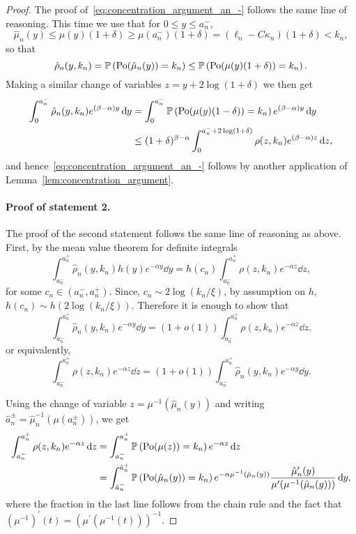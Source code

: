 \begin{proof}
The proof of~\eqref{eq:concentration_argument_an_-} follows the same line of reasoning. This time we use that for $0 \le y \le a_n^-$,
\[
	\hat{\mu}_n(y) \le \mu(y)(1 + \delta) \ge \mu(a_n^-)(1 + \delta)
		= (\ell_n - C \kappa_n)(1 + \delta) < k_n,
\]
so that 
\[
	\hat{\rho}_n(y,k_n) = \mathbb{P}\left({\mathrm{Po}}(\hat{\mu}_n(y)) = k_n\right) \le \mathbb{P}\left({\mathrm{Po}}(\mu(y)(1+\delta)) = k_n\right).
\]
Making a similar change of variables $z = y + 2 \log(1+\delta)$ we then get
\begin{align*}
	\int_0^{a_n^-} \hat{\rho}_n(y,k_n) e^{(\beta - \alpha)y} \operatorname{\mathrm{d}\hspace{-2pt}} y
	&= \int_0^{a_n^-}\mathbb{P}\left({\mathrm{Po}}(\mu(y)(1-\delta)) = k_n\right) 
		e^{(\beta-\alpha) y} \operatorname{\mathrm{d}\hspace{-2pt}} y\\
	&\le (1+\delta)^{\beta - \alpha} \int_0^{a_n^- + 2\log(1+\delta)} 
		\rho(z,k_n) e^{(\beta - \alpha)z} \operatorname{\mathrm{d}\hspace{-2pt}} z,
\end{align*}
and hence~\eqref{eq:concentration_argument_an_-} follows by another application of Lemma~\ref{lem:concentration_argument}. 

\paragraph{Proof of statement 2.}

The proof of the second statement follows the same line of reasoning as above. First, by the mean value theorem for definite integrals 
\[
	\int_{a_n^-}^{a_n^+} \hat{\rho}_n(y,k_n) h(y) e^{-\alpha y} \dd y
	= h(c_n) \int_{a_n^-}^{a_n^+} \rho(z,k_n) e^{-\alpha z} \dd z,
\]
for some $c_n \in (a_n^-, a_n^+)$. Since, $c_n \sim 2 \log(k_n/\xi)$, by assumption on $h$, $h(c_n)\sim h(2\log(k_n/\xi))$. Therefore it is enough to show that
\[
	\int_{a_n^-}^{a_n^+} \hat{\rho}_n(y,k_n) e^{-\alpha y} \dd y
	= \left(1 + o(1)\right) \int_{a_n^-}^{a_n^+} \rho(z,k_n) e^{-\alpha z} \dd z.
\] 
or equivalently,
\[
	\int_{a_n^-}^{a_n^+} \rho(z,k_n) e^{-\alpha z} \dd z
	= \left(1 + o(1)\right)\int_{a_n^-}^{a_n^+} \hat{\rho}_n(y,k_n) e^{-\alpha y} \dd y.
\] 

Using the change of variable $z = \mu^{-1}(\hat{\mu}_n(y))$ and writing $\hat{a}_n^\pm = \hat{\mu}_n^{-1}(\mu(a_n^\pm))$, we get
\begin{align*}
	\int_{a_n^-}^{a_n^+} \rho(z,k_n) e^{-\alpha z} \operatorname{\mathrm{d}\hspace{-2pt}} z 
	&= \int_{a_n^-}^{a_n^+} \mathbb{P}\left({\mathrm{Po}}(\mu(z)) = k_n\right) e^{-\alpha z} \operatorname{\mathrm{d}\hspace{-2pt}} z\\
	&= \int_{\hat{a}_n^-}^{\hat{a}_n^+} \mathbb{P}\left({\mathrm{Po}}(\hat{\mu}_n(y)) = k_n\right) e^{-\alpha \mu^{-1}(\hat{\mu}_n(y))} 
		\frac{\hat{\mu}_n^\prime(y)}{\mu^\prime(\mu^{-1}(\hat{\mu}_n(y)))} \operatorname{\mathrm{d}\hspace{-2pt}} y,
\end{align*}
where the fraction in the last line follows from the chain rule and the fact that $(\mu^{-1})^\prime(t) = (\mu^\prime(\mu^{-1}(t)))^{-1}$.


\end{proof}
